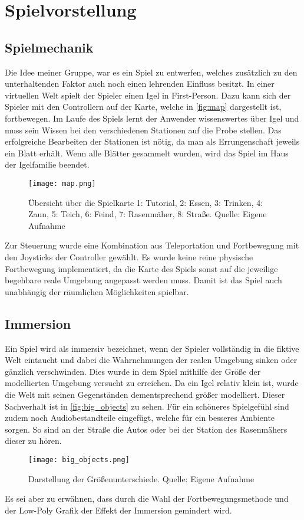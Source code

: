 \chapter{Spielvorstellung}
\section{Spielmechanik}
Die Idee meiner Gruppe, war es ein Spiel zu entwerfen, welches zusätzlich zu den unterhaltenden Faktor auch noch einen lehrenden Einfluss besitzt. In einer virtuellen Welt spielt der Spieler einen Igel in First-Person. Dazu kann sich der Spieler mit den Controllern auf der Karte, welche in \autoref{fig:map} dargestellt ist, fortbewegen. Im Laufe des Spiels lernt der Anwender wissenswertes über Igel und muss sein Wissen bei den verschiedenen Stationen auf die Probe stellen. Das erfolgreiche Bearbeiten der Stationen ist nötig, da man als Errungenschaft jeweils ein Blatt erhält. Wenn alle Blätter gesammelt wurden, wird das Spiel im Haus der Igelfamilie beendet.

\begin{figure}[H]
	\centering
	\texttt{[image: map.png]}
	\caption[Übersicht über die Spielkarte]{Übersicht über die Spielkarte 1: Tutorial, 2: Essen, 3: Trinken, 4: Zaun, 5: Teich, 6: Feind, 7: Rasenmäher, 8: Straße. Quelle: Eigene Aufnahme}
	\label{fig:map}
\end{figure}
 
Zur Steuerung wurde eine Kombination aus Teleportation und Fortbewegung mit den Joysticks der Controller gewählt. Es wurde keine reine physische Fortbewegung implementiert, da die Karte des Spiels sonst auf die jeweilige begehbare reale Umgebung angepasst werden muss. Damit ist das Spiel auch unabhängig der räumlichen Möglichkeiten spielbar.


\section{Immersion}
Ein Spiel wird als immersiv bezeichnet, wenn der Spieler vollständig in die fiktive Welt eintaucht und dabei die Wahrnehmungen der realen Umgebung sinken oder gänzlich verschwinden. Dies wurde in dem Spiel mithilfe der Größe der modellierten Umgebung versucht zu erreichen. Da ein Igel relativ klein ist, wurde die Welt mit seinen Gegenständen dementsprechend größer modelliert. Dieser Sachverhalt ist in \autoref{fig:big_objects} zu sehen. Für ein schöneres Spielgefühl sind zudem noch Audiobestandteile eingefügt, welche für ein besseres Ambiente sorgen. So sind an der Straße die Autos oder bei der Station des Rasenmähers dieser zu hören.

\begin{figure}[H]
	\centering
	\texttt{[image: big\_objects.png]}
	\caption[Darstellung der Größenunterschiede]{Darstellung der Größenunterschiede. Quelle: Eigene Aufnahme}
	\label{fig:big_objects}
\end{figure}

Es sei aber zu erwähnen, dass durch die Wahl der Fortbewegungsmethode und der Low-Poly Grafik der Effekt der Immersion gemindert wird.
